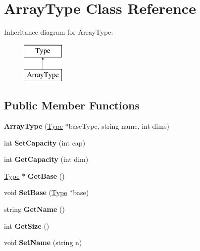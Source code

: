 \hypertarget{classArrayType}{\section{Array\-Type Class Reference}
\label{classArrayType}
}
Inheritance diagram for Array\-Type\-:\begin{figure}[H]
\begin{center}
\leavevmode
\includegraphics[height=2.000000cm]{classArrayType}
\end{center}
\end{figure}
\subsection*{Public Member Functions}
\begin{DoxyCompactItemize}
\item 
\hypertarget{classArrayType_a90aea374946e0e5cf4b89fc039969f82}{{\bfseries Array\-Type} (\hyperlink{classType}{Type} $\ast$base\-Type, string name, int dims)}\label{classArrayType_a90aea374946e0e5cf4b89fc039969f82}

\item 
\hypertarget{classArrayType_acff47fdbadc911bcb3236dcb9e8dd0a4}{int {\bfseries Set\-Capacity} (int cap)}\label{classArrayType_acff47fdbadc911bcb3236dcb9e8dd0a4}

\item 
\hypertarget{classArrayType_a97ce54630d5df790a8a706cb2f1c5751}{int {\bfseries Get\-Capacity} (int dim)}\label{classArrayType_a97ce54630d5df790a8a706cb2f1c5751}

\item 
\hypertarget{classArrayType_ac874b4e13dba44082d7eec7e057fd74c}{\hyperlink{classType}{Type} $\ast$ {\bfseries Get\-Base} ()}\label{classArrayType_ac874b4e13dba44082d7eec7e057fd74c}

\item 
\hypertarget{classArrayType_ae198281d73c175b70c41856ee9bcfbb9}{void {\bfseries Set\-Base} (\hyperlink{classType}{Type} $\ast$base)}\label{classArrayType_ae198281d73c175b70c41856ee9bcfbb9}

\item 
\hypertarget{classType_a8143fe4686ae1a5709a5955396c6ee26}{string {\bfseries Get\-Name} ()}\label{classType_a8143fe4686ae1a5709a5955396c6ee26}

\item 
\hypertarget{classType_afe0fca035825759785b525d2a24f69fe}{int {\bfseries Get\-Size} ()}\label{classType_afe0fca035825759785b525d2a24f69fe}

\item 
\hypertarget{classType_ab8d2328a3a76289edf42b9bf0d4f278f}{void {\bfseries Set\-Name} (string n)}\label{classType_ab8d2328a3a76289edf42b9bf0d4f278f}

\end{DoxyCompactItemize}
